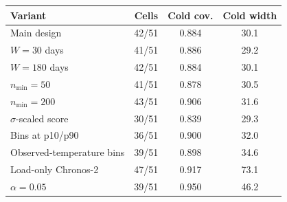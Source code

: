 \begin{tabular}{@{}lccc@{}}
\toprule
Variant & Cells & Cold cov. & Cold width \\
\midrule
Main design & 42/51 & 0.884 & 30.1 \\
$W=30$ days & 41/51 & 0.886 & 29.2 \\
$W=180$ days & 42/51 & 0.884 & 30.1 \\
$n_{\min}=50$ & 41/51 & 0.878 & 30.5 \\
$n_{\min}=200$ & 43/51 & 0.906 & 31.6 \\
$\sigma$-scaled score & 30/51 & 0.839 & 29.3 \\
Bins at p10/p90 & 36/51 & 0.900 & 32.0 \\
Observed-temperature bins & 39/51 & 0.898 & 34.6 \\
Load-only Chronos-2 & 47/51 & 0.917 & 73.1 \\
$\alpha=0.05$ & 39/51 & 0.950 & 46.2 \\
\bottomrule
\end{tabular}
